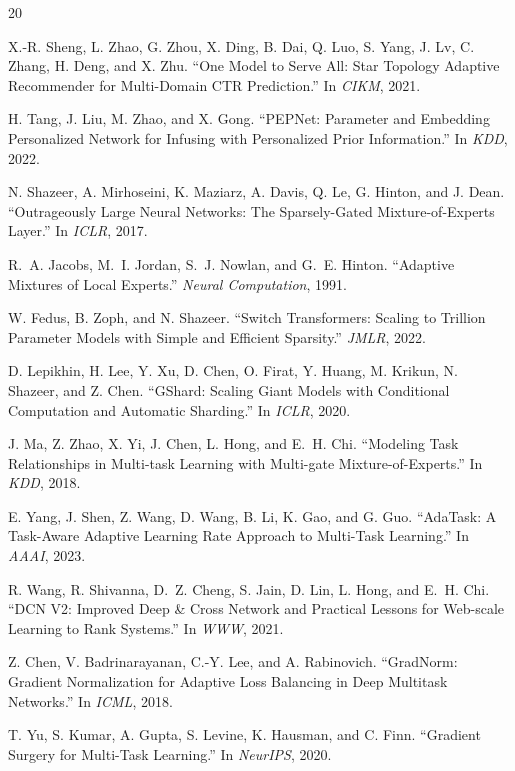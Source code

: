 \documentclass{article}
\begin{document}

\begin{thebibliography}{20}

X.-R. Sheng, L. Zhao, G. Zhou, X. Ding, B. Dai, Q. Luo, S. Yang, J. Lv, C. Zhang, H. Deng, and X. Zhu.
``One Model to Serve All: Star Topology Adaptive Recommender for Multi-Domain CTR Prediction.''
In \emph{CIKM}, 2021.

H. Tang, J. Liu, M. Zhao, and X. Gong.
``PEPNet: Parameter and Embedding Personalized Network for Infusing with Personalized Prior Information.''
In \emph{KDD}, 2022.

N. Shazeer, A. Mirhoseini, K. Maziarz, A. Davis, Q. Le, G. Hinton, and J. Dean.
``Outrageously Large Neural Networks: The Sparsely-Gated Mixture-of-Experts Layer.''
In \emph{ICLR}, 2017.

R.~A. Jacobs, M.~I. Jordan, S.~J. Nowlan, and G.~E. Hinton.
``Adaptive Mixtures of Local Experts.''
\emph{Neural Computation}, 1991.

W. Fedus, B. Zoph, and N. Shazeer.
``Switch Transformers: Scaling to Trillion Parameter Models with Simple and Efficient Sparsity.''
\emph{JMLR}, 2022.

D. Lepikhin, H. Lee, Y. Xu, D. Chen, O. Firat, Y. Huang, M. Krikun, N. Shazeer, and Z. Chen.
``GShard: Scaling Giant Models with Conditional Computation and Automatic Sharding.''
In \emph{ICLR}, 2020.

J. Ma, Z. Zhao, X. Yi, J. Chen, L. Hong, and E.~H. Chi.
``Modeling Task Relationships in Multi-task Learning with Multi-gate Mixture-of-Experts.''
In \emph{KDD}, 2018.

E. Yang, J. Shen, Z. Wang, D. Wang, B. Li, K. Gao, and G. Guo.
``AdaTask: A Task-Aware Adaptive Learning Rate Approach to Multi-Task Learning.''
In \emph{AAAI}, 2023.

R. Wang, R. Shivanna, D.~Z. Cheng, S. Jain, D. Lin, L. Hong, and E.~H. Chi.
``DCN V2: Improved Deep \& Cross Network and Practical Lessons for Web-scale Learning to Rank Systems.''
In \emph{WWW}, 2021.

Z. Chen, V. Badrinarayanan, C.-Y. Lee, and A. Rabinovich.
``GradNorm: Gradient Normalization for Adaptive Loss Balancing in Deep Multitask Networks.''
In \emph{ICML}, 2018.

T. Yu, S. Kumar, A. Gupta, S. Levine, K. Hausman, and C. Finn.
``Gradient Surgery for Multi-Task Learning.''
In \emph{NeurIPS}, 2020.


\end{thebibliography}
\end{document}
